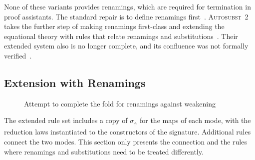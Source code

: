 \documentclass[sigplan,anonymous,review]{acmart}
\newcommand{\ag}[1]{\AgdaFunction{#1}}
\theoremstyle{acmdefinition}
\newcommand{\agc}[1]{\AgdaInductiveConstructor{#1}}
\newcommand{\agop}[1]{\mathbin{\AgdaFunction{#1}}}
\begin{document}
None of these variants provides renamings, which are required for termination
in proof assistants. The standard repair is to define renamings
first~\cite{10.1007/11617990_1}. \textsc{Autosubst~2} takes the further step of
making renamings first-class and extending the equational theory with rules
that relate renamings and substitutions~\cite{10.1145/3293880.3294101}. Their
extended system also is no longer complete, and its confluence was not formally
verified~\cite{Stark:2020:Mechanising}.

\subsection{Extension with Renamings}\label{sec:mis-sig}
\begin{figure}[!t]
  \centering
  \caption{Attempt to complete the fold for renamings against weakening}\label{fig:push-forced}
\end{figure}

The extended rule set includes a copy of $σ_\Uparrow$ for the maps of each
mode, with the reduction laws instantiated to the constructors of the
signature. Additional rules connect the two modes. This section only presents
the connection and the rules where renamings and substitutions need to be
treated differently.
\end{document}
